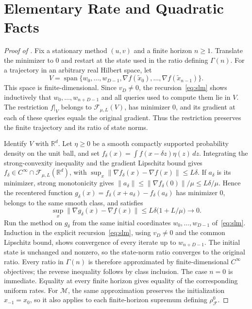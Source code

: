 \documentclass[11pt]{article}
\theoremstyle{definition}
\theoremstyle{remark}
\newcommand{\R}{\mathbb R}
\newcommand{\cF}{\mathcal F}
\newcommand{\cM}{\mathcal M}
\newcommand{\norm}[1]{\lVert #1\rVert}
\newcommand{\rhoz}{\rho_{\cF}^{0}}
\begin{document}
\appendix

%
\section{Elementary Rate and Quadratic Facts}
\label{app:prelim}
%

\begin{proof}[Proof of ]
Fix a stationary method \((u,v)\) and a finite horizon \(n\ge1\).
Translate the minimizer to \(0\) and restart at the state used in the ratio defining \(\Gamma(n)\).
For a trajectory in an arbitrary real Hilbert space, let
\[
V=\operatorname{span}\{w_0,\ldots,w_{D-1},
\nabla f(\tilde x_0),\ldots,\nabla f(\tilde x_{n-1})\}.
\]
This space is finite-dimensional.  Since \(v_D\ne0\), the recursion~\eqref{eq:slm} shows inductively
that \(w_0,\ldots,w_{n+D-1}\) and all queries used to compute them lie in \(V\).
The restriction \(f|_V\) belongs to \(\cF_{\mu,L}(V)\), has minimizer \(0\), and its gradient at each
of these queries equals the original gradient.  Thus the restriction preserves the finite trajectory
and its ratio of state norms.

Identify \(V\) with \(\R^d\).  Let \(\eta\ge0\) be a smooth compactly supported probability density
on the unit ball, and set \(f_\delta(x)=\int f(x-\delta z)\eta(z)\,dz\).
Integrating the strong-convexity inequality and the gradient Lipschitz bound gives
\(f_\delta\in C^\infty\cap\cF_{\mu,L}(\R^d)\), with
\(\sup_x\norm{\nabla f_\delta(x)-\nabla f(x)}\le L\delta\).
If \(a_\delta\) is its minimizer, strong monotonicity gives
\(\norm{a_\delta}\le\norm{\nabla f_\delta(0)}/\mu\le L\delta/\mu\).
Hence the recentered function
\(g_\delta(x)=f_\delta(x+a_\delta)-f_\delta(a_\delta)\) has minimizer \(0\), belongs to the same smooth
class, and satisfies
\[
\sup_x\norm{\nabla g_\delta(x)-\nabla f(x)}
\le L\delta\bigl(1+L/\mu\bigr)\longrightarrow0.
\]
Run the method on \(g_\delta\) from the same initial coordinates
\(w_0,\ldots,w_{D-1}\) of~\eqref{eq:slm}.
Induction in the explicit recursion~\eqref{eq:slm}, using \(v_D\ne0\) and the common Lipschitz bound,
shows convergence of every iterate up to \(w_{n+D-1}\).
The initial state is unchanged and nonzero, so the state-norm ratio converges to the original ratio.
Every ratio in \(\Gamma(n)\) is therefore approximated by finite-dimensional \(C^\infty\) objectives;
the reverse inequality follows by class inclusion.  The case \(n=0\) is immediate.
Equality at every finite horizon gives equality of the corresponding uniform rates.
For \(\cM\), the same approximation preserves the initialization \(x_{-1}=x_0\), so it also applies
to each finite-horizon supremum defining \(\rhoz\).
\end{proof}
\end{document}
